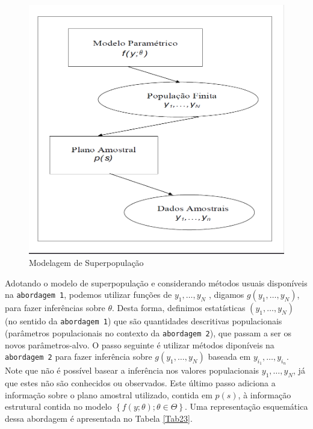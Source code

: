 \documentclass[]{book}
\numberwithin{example}{chapter}
\numberwithin{remark}{chapter}
\numberwithin{definition}{chapter}
\begin{document}
\begin{figure}[htbp]
\centering
\includegraphics{Figuras/fig23.png}
\caption{\label{fig:modsup}Modelagem de Superpopulação}
\end{figure}

Adotando o modelo de superpopulação e considerando métodos usuais
disponíveis na \texttt{abordagem\ 1}, podemos utilizar funções de
\(y_{1},\ldots ,y_{N}\) , digamos \(g( y_{1},\ldots ,y_{N})\), para
fazer inferências sobre \(\theta\). Desta forma, definimos estatísticas
\(\left( y_{1},\ldots ,y_{N}\right)\) (no sentido da
\texttt{abordagem\ 1}) que são quantidades descritivas populacionais
(parâmetros populacionais no contexto da \texttt{abordagem\ 2}), que
passam a ser os novos parâmetros-alvo. O passo seguinte é utilizar
métodos diponíveis na \texttt{abordagem\ 2} para fazer inferência sobre
\(g\left( y_{1},\ldots ,y_{N}\right)\) baseada em
\(y_{i_1},\ldots ,y_{i_n}\). Note que não é possível basear a inferência
nos valores populacionais \(y_{1},\ldots ,y_{N}\), já que estes não são
conhecidos ou observados. Este último passo adiciona a informação sobre
o plano amostral utilizado, contida em \(p(s)\), à informação estrutural
contida no modelo
\(\left\{ f\left( y;\theta \right) ;\theta \in \Theta\right\}\). Uma
representação esquemática dessa abordagem é apresentada no Tabela
\ref{Tab23}.
\end{document}
